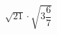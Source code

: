 \begin{ex}[type=calculate]
	\begin{condition}
		\( \sqrt{21}\cdot\sqrt{3\dfrac{6}{7}} \)
	\end{condition}
\end{ex}